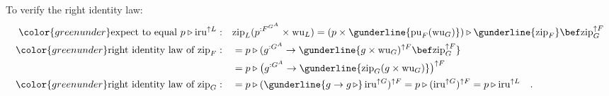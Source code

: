 To verify the right identity law:
\begin{align*}
{\color{greenunder}\text{expect to equal }p\triangleright\text{iru}^{\uparrow L}:}\quad & \text{zip}_{L}(p^{:F^{G^{A}}}\times\text{wu}_{L})=(p\times\gunderline{\text{pu}_{F}(\text{wu}_{G})})\triangleright\gunderline{\text{zip}_{F}}\bef\text{zip}_{G}^{\uparrow F}\\
{\color{greenunder}\text{right identity law of }\text{zip}_{F}:}\quad & =p\triangleright(g^{:G^{A}}\rightarrow\gunderline{g\times\text{wu}_{G})^{\uparrow F}\bef\text{zip}_{G}^{\uparrow F}}\\
 & =p\triangleright\big(g^{:G^{A}}\rightarrow\gunderline{\text{zip}_{G}(g\times\text{wu}_{G})}\big)^{\uparrow F}\\
{\color{greenunder}\text{right identity law of }\text{zip}_{G}:}\quad & =p\triangleright(\gunderline{g\rightarrow g\,\triangleright}\,\text{iru}^{\uparrow G})^{\uparrow F}=p\triangleright(\text{iru}^{\uparrow G})^{\uparrow F}=p\triangleright\text{iru}^{\uparrow L}\quad.
\end{align*}

